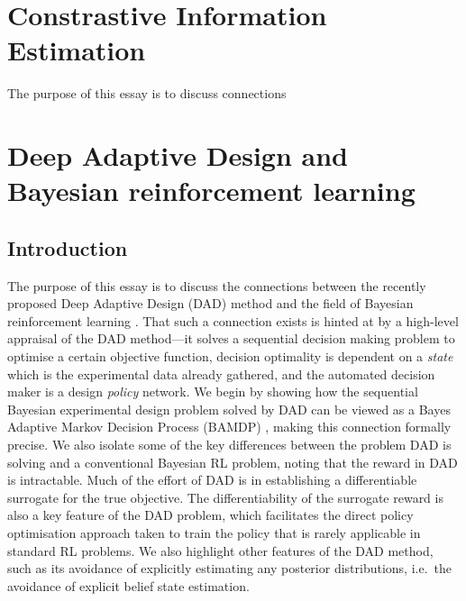 \documentclass[a4paper, 10pt]{report}
\theoremstyle{plain}
\begin{document}
	
	\clearpage
	\section{Constrastive Information Estimation }
	\label{sec:smcessay}
	
	The purpose of this essay is to discuss connections 
	
	
	
	
	\clearpage
	\section{Deep Adaptive Design and Bayesian reinforcement learning}
	\label{sec:brlessay}
	
	\subsection{Introduction}
	The purpose of this essay is to discuss the connections between the recently proposed Deep Adaptive Design (DAD) \citep{foster2021dad} method and the field of Bayesian reinforcement learning \citep{ghavamzadeh2016bayesian}.
	That such a connection exists is hinted at by a high-level appraisal of the DAD method---it solves a sequential decision making problem to optimise a certain objective function, decision optimality is dependent on a \emph{state} which is the experimental data already gathered, and the automated decision maker is a design \emph{policy} network.
	We begin by showing how the sequential Bayesian experimental design problem solved by DAD can be viewed as a Bayes Adaptive Markov Decision Process (BAMDP) \citep{ross2007bayes,guez2012efficient}, making this connection formally precise.
	We also isolate some of the key differences between the problem DAD is solving and a conventional Bayesian RL problem, noting that the reward in DAD is intractable. Much of the effort of DAD is in establishing a differentiable surrogate for the true objective.
	The differentiability of the surrogate reward is also a key feature of the DAD problem, which facilitates the direct policy optimisation approach taken to train the policy that is rarely applicable in standard RL problems.
	We also highlight other features of the DAD method, such as its avoidance of explicitly estimating any posterior distributions, i.e.~the avoidance of explicit belief state estimation.
	
\end{document}
